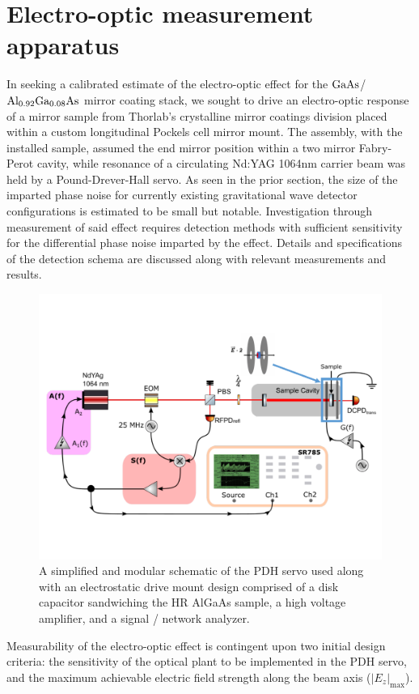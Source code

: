 \section{Electro-optic measurement apparatus}
In seeking a calibrated estimate of the electro-optic effect for the $\mathrm{GaAs}$/$\mathrm{Al_{0.92}Ga_{0.08}As}$ mirror coating stack, we sought to drive an electro-optic response of a mirror sample from Thorlab's crystalline mirror coatings division placed within a custom longitudinal Pockels cell mirror mount. The assembly, with the installed sample, assumed the end mirror position within a two mirror Fabry-Perot cavity, while resonance of a circulating Nd:YAG 1064nm carrier beam was held by a Pound-Drever-Hall servo. As seen in the prior section, the size of the imparted phase noise for currently existing gravitational wave detector configurations is estimated to be small but notable. Investigation through measurement of said effect requires detection methods with sufficient sensitivity for the differential phase noise imparted by the effect. Details and specifications of the detection schema are discussed along with relevant measurements and results. 



\begin{figure}[H]
	\includegraphics[width=\textwidth]{figs/ALGAAS/algaas_pockels_effect_measurement_schematic.pdf}
	\caption{A simplified and modular schematic of the PDH servo used along with an electrostatic drive mount design comprised of a disk capacitor sandwiching the HR AlGaAs sample, a high voltage amplifier, and a signal / network analyzer.}
\label{fig:simpschema}
\end{figure}
 Measurability of the electro-optic effect is contingent upon two initial design criteria: the sensitivity of the optical plant to be implemented in the PDH servo, and the maximum achievable electric field strength along the beam axis ($|E_z|_\mathrm{max}$).

